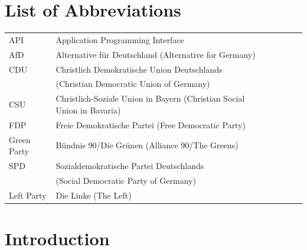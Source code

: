 \documentclass[a4paper,11pt]{article}
\begin{document}
\newpage
\hypertarget{list-of-abbreviations}{%
\section*{List of Abbreviations}\label{list-of-abbreviations}}
\begin{tabular}{llp{1cm}rp{0.2cm}l}
    API   & Application Programming Interface \\
    AfD   & Alternative für Deutschland (Alternative for Germany) \\
    CDU   & Christlich Demokratische Union Deutschlands \\
          & (Christian Democratic Union of Germany) \\
    CSU   & Christlich-Soziale Union in Bayern (Christian Social Union in Bavaria) \\
    FDP   & Freie Demokratische Partei (Free Democratic Party) \\
    Green Party & Bündnis 90/Die Grünen (Alliance 90/The Greens) \\
    SPD   & Sozialdemokratische Partei Deutschlands \\
          & (Social Democratic Party of Germany) \\
    Left Party & Die Linke (The Left) \\
\end{tabular}
\newpage
\listoffigures
{}

\newpage
\listoftables
{}

\newpage
\pagestyle{plain}       
\setcounter{page}{1}    %

\hypertarget{intro}{%
\section{Introduction}\label{intro}}
\end{document}
